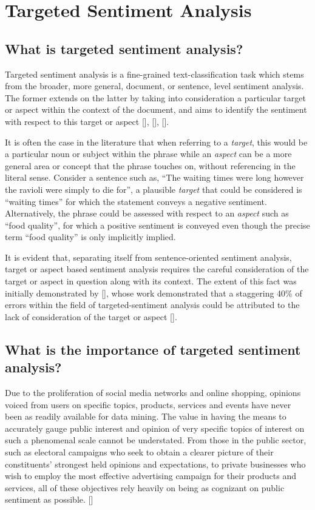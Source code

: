 \documentclass[12pt, a4paper]{report}
\theoremstyle{definition}
\theoremstyle{definition}%
\theoremstyle{definition}%
\theoremstyle{definition}%
\theoremstyle{definition}%
\theoremstyle{definition}%
\renewcommand{\cite}[1]{[\citealp{#1}]}
\begin{document}
\section{Targeted Sentiment Analysis}
\subsection{What is targeted sentiment analysis?}
Targeted sentiment analysis is a fine-grained text-classification task which stems from the broader, more general, document, or sentence, level sentiment analysis. The former extends on the latter by taking into consideration a particular target or aspect within the context of the document, and aims to identify the sentiment with respect to this target or aspect \cite{pang2008}, \cite{liu2012}, \cite{pontiki}.

It is often the case in the literature that when referring to a \textit{target}, this would be a particular noun or subject within the phrase while an \textit{aspect} can be a more general area or concept that the phrase touches on, without referencing in the literal sense. Consider a sentence such as, \enquote{The waiting times were long however the ravioli were simply to die for}, a plausible \textit{target} that could be considered is \enquote{waiting times} for which the statement conveys a negative sentiment. Alternatively, the phrase could be assessed with respect to an \textit{aspect} such as \enquote{food quality}, for which a positive sentiment is conveyed even though the precise term \enquote{food quality} is only implicitly implied.

It is evident that, separating itself from sentence-oriented sentiment analysis, target or aspect based sentiment analysis requires the careful consideration of the target or aspect in question along with its context. The extent of this fact was initially demonstrated by \cite{jiang2011}, whose work demonstrated that a staggering 40\% of errors within the field of targeted-sentiment analysis could be attributed to the lack of consideration of the target or aspect \cite{jiang2011}.

\subsection{What is the importance of targeted sentiment analysis?}
Due to the proliferation of social media networks and online shopping, opinions voiced from users on specific topics, products, services and events have never been as readily available for data mining. The value in having the means to accurately gauge public interest and opinion of very specific topics of interest on such a phenomenal scale cannot be understated. From those in the public sector, such as electoral campaigns who seek to obtain a clearer picture of their constituents' strongest held opinions and expectations, to private businesses who wish to employ the most effective advertising campaign for their products and services, all of these objectives rely heavily on being as cognizant on public sentiment as possible. \cite{tang2016}
\end{document}
